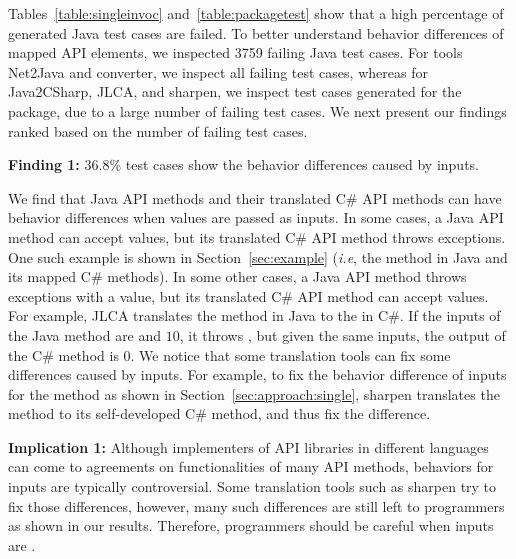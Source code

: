 Tables~\ref{table:singleinvoc} and~\ref{table:packagetest} show that a high percentage of generated Java test cases are failed. To better understand behavior differences of mapped API elements, we inspected 3759 failing Java test cases. For tools Net2Java and converter, we inspect all failing test cases, whereas for Java2CSharp, JLCA, and sharpen, we inspect test cases generated for the  package, due to a large number of failing test cases. We next present our findings ranked based on the number of failing test cases.

\textbf{Finding 1:} 36.8\% test cases show the behavior differences caused by  inputs.

We find that Java API methods and their translated C\# API methods can have behavior differences when  values are passed as inputs. In some cases, a Java API method can accept  values, but its translated C\# API method throws exceptions. One such example is shown in Section~\ref{sec:example} (\emph{i.e}, the  method in Java and its mapped C\# methods). In some other cases, a Java API method throws exceptions with a  value, but its translated C\# API method can accept  values. For example, JLCA translates the  method in Java to the  in C\#. If the inputs of the Java method are  and $10$, it throws , but given the same inputs, the output of the C\# method is 0. We notice that some translation tools can fix some differences caused by  inputs. For example, to fix the behavior difference of  inputs for the  method as shown in Section~\ref{sec:approach:single}, sharpen translates the method to its self-developed C\# method, and thus fix the difference.


\textbf{Implication 1:} Although implementers of API libraries in different languages can come to agreements on functionalities of many API methods, behaviors for  inputs are typically controversial. Some translation tools such as sharpen try to fix those differences, however, many such differences are still left to programmers as shown in our results. Therefore, programmers should be careful when inputs are .

